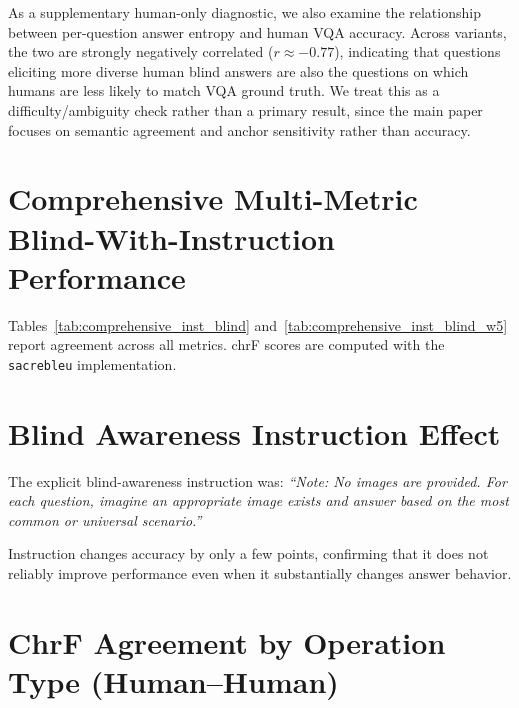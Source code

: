 \documentclass[letterpaper]{article}
\begin{document}
As a supplementary human-only diagnostic, we also examine the relationship
between per-question answer entropy and human VQA accuracy. Across variants,
the two are strongly negatively correlated ($r\approx -0.77$), indicating that
questions eliciting more diverse human blind answers are also the questions on
which humans are less likely to match VQA ground truth. We treat this as a
difficulty/ambiguity check rather than a primary result, since the main paper
focuses on semantic agreement and anchor sensitivity rather than accuracy.

\section{Comprehensive Multi-Metric Blind-With-Instruction Performance}
\label{app:metrics}

Tables~\ref{tab:comprehensive_inst_blind}
and~\ref{tab:comprehensive_inst_blind_w5} report agreement across all metrics.
chrF scores are computed with the \texttt{sacrebleu} implementation.





\section{Blind Awareness Instruction Effect}
\label{app:inst}

The explicit blind-awareness instruction was: \textit{``Note: No images are provided. For each
question, imagine an appropriate image exists and answer based on the most
common or universal scenario.''}

Instruction changes accuracy by only a few points, confirming that it does
not reliably improve performance even when it substantially changes answer
behavior.

\section{ChrF Agreement by Operation Type (Human--Human)}
\label{app:chrf_human}
\end{document}
